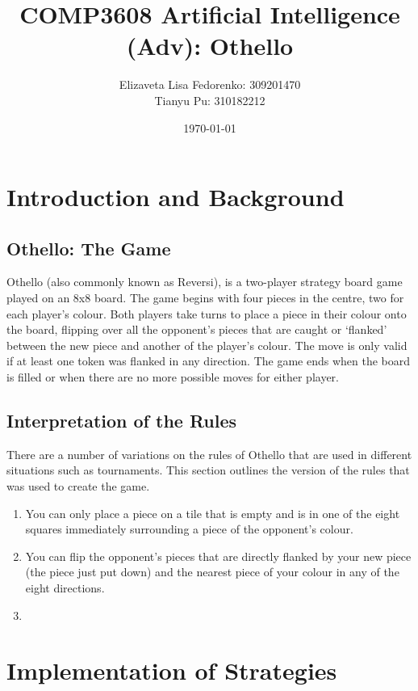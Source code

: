 \documentclass[12pt]{article}
\title{COMP3608 Artificial Intelligence (Adv): Othello}
\author{Elizaveta Lisa Fedorenko: 309201470
\\ Tianyu Pu: 310182212}
\date{\today}
\begin{document}
\maketitle

\begin{abstract}
\end{abstract}

\section{Introduction and Background}
\subsection{Othello: The Game}
Othello (also commonly known as Reversi), is a two-player strategy board game played on an 8x8 board. 
The game begins with four pieces in the centre, two for each player's colour. Both players take turns
to place a piece in their colour onto the board, flipping over all the opponent's pieces that are caught
or `flanked' between the new piece and another of the player's colour. The move is only valid if at 
least one token was flanked in any direction. The game ends when the board is filled or when there are
no more possible moves for either player.

\subsection{Interpretation of the Rules}
There are a number of variations on the rules of Othello that are used in different situations such as
tournaments. This section outlines the version of the rules that was used to create the game.
\begin{enumerate}
 \item You can only place a piece on a tile that is empty and is in one of the eight squares immediately
 surrounding a piece of the opponent's colour.
 \item You can flip the opponent's pieces that are directly flanked by your new piece (the piece just
 put down) and the nearest piece of your colour in any of the eight directions.
 \item
\end{enumerate}

\section{Implementation of Strategies}
\end{document}
